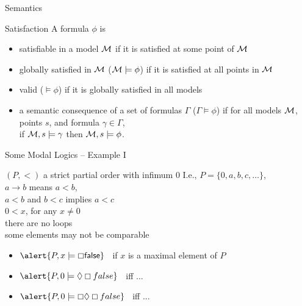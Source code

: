 \documentclass[aspectratio=169]{beamer}
\begin{document}
\begin{slide}{Semantics}\label{s:14}
\small
\begin{block}{Satisfaction}
A formula $\phi$ is
\begin{itemize}
\item \alert{satisfiable in a model}  $\mathcal{M}$ if it is satisfied at some point of $\mathcal{M}$
\item \alert{globally satisfied} in $\mathcal{M}$ ($\mathcal{M} \models \phi$) if it is satisfied at all points in $\mathcal{M}$
\item \alert{valid} ($\models \phi$) if it is globally satisfied in all models
\item \alert{a semantic consequence} of a set of formulas $\Gamma$ ($\Gamma \models \phi$) if
  for all models $\mathcal{M}$,
          points $s$, and
          formula $\gamma \in \Gamma$,
  \\\centering if $\mathcal{M}, s \models \gamma$ then $\mathcal{M}, s \models \phi$.

\end{itemize}
\end{block}
\end{slide}


\begin{slide}{Some Modal Logics -- Example I}\label{s:16}
\small
\begin{block}{$(P,<)$ a strict partial order with infimum $0$}
I.e., $P=\{0, a, b, c, \ldots\}$,
\\$a\to b$ means $a<b$,
\\$a<b$ and $b<c$ implies $a<c$
\\$0 < x$, for any $x\neq 0$
\\there are no loops
\\some elements may not be comparable
\\[5mm]

\begin{itemize}
\item $\alert{P, x \models \always \false}\; \;$  if $x$ is a maximal element of $P$
\item $\alert{P, 0 \models \eventual \always false}\; \;$  iff  ... %
\item $\alert{P, 0 \models \always \eventual \always false}\; \;$  iff  ... %
\end{itemize}
\end{block}
\end{slide}
\end{document}
